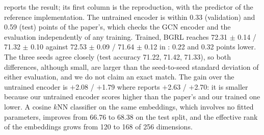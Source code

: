 \documentclass[conference]{IEEEtran}
\begin{document}
\begin{table}[htbp]
\centering
\caption{BGRL on ogbn-arxiv under the protocol of \cite{bgrl}: linear-probe accuracy (\%), mean $\pm$ sample std. This work: 3 seeds, probe of , with the predictor of the public BGRL implementation (``Ref.'', Linear--PReLU--Linear) and with the library's default predictor (``Default'', Linear--BatchNorm--ReLU--Linear). \cite{bgrl}: 20 seeds, its own linear evaluation (Table~5). ``Untrained encoder'' is the same encoder at initialization; ``Gain'' is BGRL minus the untrained encoder (computed per seed for this work).}
\label{tab:arxiv-reproduction}
\footnotesize
\setlength{\tabcolsep}{4pt}
\end{table}

 reports the result; its first column is the reproduction, with the predictor of the reference implementation. The untrained encoder is within 0.33 (validation) and 0.59 (test) points of the paper's, which checks the GCN encoder and the evaluation independently of any training. Trained, BGRL reaches 72.31 $\pm$ 0.14 / 71.32 $\pm$ 0.10 against 72.53 $\pm$ 0.09 / 71.64 $\pm$ 0.12 in \cite{bgrl}: 0.22 and 0.32 points lower. The three seeds agree closely (test accuracy 71.22, 71.42, 71.33), so both differences, although small, are larger than the seed-to-seed standard deviation of either evaluation, and we do not claim an exact match. The gain over the untrained encoder is $+$2.08 / $+$1.79 where \cite{bgrl} reports $+$2.63 / $+$2.70: it is smaller because our untrained encoder scores higher than the paper's and our trained one lower. A cosine $k$NN classifier on the same embeddings, which involves no fitted parameters, improves from 66.76 to 68.38 on the test split, and the effective rank of the embeddings grows from 120 to 168 of 256 dimensions.
\end{document}
